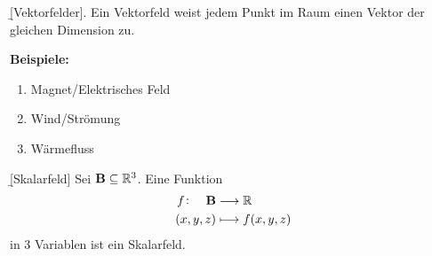 \documentclass[12pt]{article}
\begin{document}
\begin{defn}{\b{[Vektorfelder].}} Ein Vektorfeld weist jedem Punkt im Raum einen Vektor der gleichen Dimension zu.

    \textbf{Beispiele:}
    \begin{enumerate}[label=(\roman*)]
        \item Magnet/Elektrisches Feld
        \item Wind/Strömung
        \item Wärmefluss
    \end{enumerate}
\end{defn}

\begin{figure}[htbp!]
    \centering
\end{figure}

\begin{defn}{\b{[Skalarfeld]}} Sei $\mathbf{B}\subseteq\mathbb{R}^3$. Eine Funktion
    \begin{align}
        f\colon\quad \mathbf{B} & \longrightarrow\mathbb{R}    \\
        (x,y,z)                 & \longmapsto f(x,y,z)
    \end{align}
    in 3 Variablen ist ein Skalarfeld.
\end{defn}\vspace*{1em}
\end{document}
